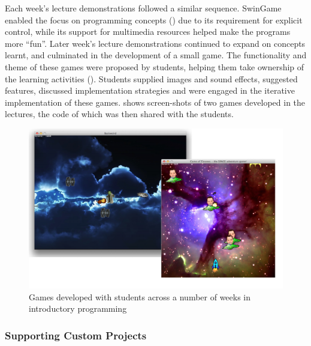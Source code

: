 
Each week's lecture demonstrations followed a similar sequence. SwinGame enabled the focus on programming concepts () due to its requirement for explicit control, while its support for multimedia resources helped make the programs more ``fun''. Later week's lecture demonstrations continued to expand on concepts learnt, and culminated in the development of a small game. The functionality and theme of these games were proposed by students, helping them take ownership of the learning activities (). Students supplied images and sound effects, suggested features, discussed implementation strategies and were engaged in the iterative implementation of these games.  shows screen-shots of two games developed in the lectures, the code of which was then shared with the students.

\begin{figure}[thbp]
  \centering
  \includegraphics[width=\textwidth]{Games}
  \caption{Games developed with students across a number of weeks in introductory programming}
  \label{fig:games}
\end{figure}


\subsubsection{Supporting Custom Projects} %
\label{sub:supporting_custom_projects}

